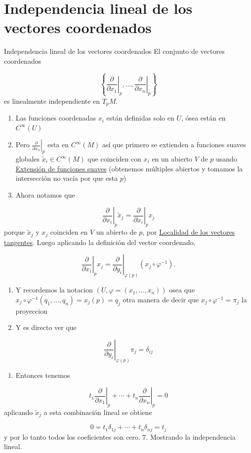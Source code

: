 \section{Independencia lineal de los vectores coordenados}
\begin{bookproposition}{Independencia lineal de los vectores coordenados}
El conjunto de vectores coordenados

\[
\left\{\left.\frac{\partial}{\partial x_1}\right|_p,\dots,\left.\frac{\partial}{\partial x_n}\right|_p\right\}
\]
es linealmente independiente en $T_pM$.

\end{bookproposition}
\begin{bookproof}{}
\begin{enumerate}
\item Las funciones coordenadas $x_i$ están definidas solo en $U$, ósea están en $C^{\infty}(U)$
\item Pero $\left.\frac{\partial}{\partial x_n}\right|_p$ esta en $C^{\infty}(M)$ así que primero se extienden a funciones suaves globales $\widetilde{x}_i\in C^\infty(M)$ que coinciden con $x_i$ en un abierto $V$ de $p$ usando \hyperref[blk:405b16]{Extensión de funciones suaves} (obtenemos múltiples abiertos y tomamos la intersección no vacía por que esta $p$)
\item Ahora notamos que
\end{enumerate}
\[
\left.\frac{\partial}{\partial x_i}\right|_{p}\widetilde{x}_{j}=\left.\frac{\partial}{\partial x_i}\right|_{p}x_{j}
\]
porque $\widetilde{x}_{j}$ y $x_j$ coinciden en $V$ un abierto de $p$, por \hyperref[blk:b713ca]{Localidad de los vectores tangentes}. Luego aplicando la definición del vector coordenado,

\[
\left.\frac{\partial}{\partial x_i}\right|_{p}x_{j}=\left.\frac{\partial}{\partial y_i}\right|_{\varphi(p)}(x_{j}\circ\varphi^{-1}).
\]
\begin{enumerate}[start=4]
\item Y recordemos la notacion $(U,\varphi=(x_{1},\ldots,x_{n}))$ osea que $x_{j}\circ\varphi ^{-1}(q_{1},\ldots,q_{n})=x_{j}(p)=q_{j}$ otra manera de decir que $x_{j}\circ\varphi ^{-1}=\pi_{j}$ la proyeccion
\item Y es directo ver que
\end{enumerate}
\[
\left.\frac{\partial}{\partial y_i}\right|_{\varphi(p)}\pi_{j}=\delta_{ij}
\]
\begin{enumerate}[start=6]
\item Entonces tenemos
\end{enumerate}
\[
t_1\left.\frac{\partial}{\partial x_1}\right|_p+\cdots+t_n\left.\frac{\partial}{\partial x_n}\right|_p=0
\]
aplicando $\widetilde{x}_j$ a esta combinación lineal se obtiene

\[
0=t_1\delta_{1j}+\cdots+t_n\delta_{nj}=t_j
\]
y por lo tanto todos los coeficientes son cero. 7. Mostrando la independencia lineal.

\bookqed
\end{bookproof}
